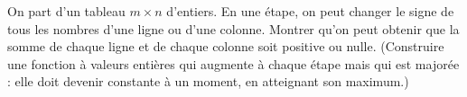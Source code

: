 On part d'un tableau $m \times n$ d'entiers. En une étape, on peut changer le signe de tous les nombres d'une ligne ou d'une colonne. Montrer qu'on peut obtenir que la somme de chaque ligne et de chaque colonne soit positive ou nulle. (Construire une fonction à valeurs entières qui augmente à chaque étape mais qui est majorée : elle doit devenir constante à un moment, en atteignant son maximum.)
